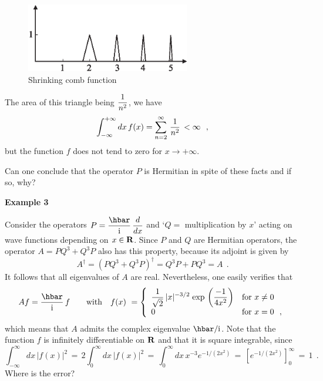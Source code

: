 \documentclass[12pt]{report}
\begin{document}
\bigskip 

\begin{figure}[h!]
\centerline{\includegraphics*[height=3cm,angle=0]{dessin2.eps}}
\caption{Shrinking comb function}
\end{figure}

\bigskip


\noindent 
The area
of this triangle being $\displaystyle{1 \over n^2}$,
we have
\[
\int_{-\infty}^{+\infty} dx \, f(x)  =
\sum_{n=2}^{\infty} \, \displaystyle{1 \over n^2} \, < \infty
\ \ ,
\]
but the function
$f$ does not tend to zero for $x \to +\infty$.


\noindent 
Can one conclude that the operator $P$ is Hermitian
in spite of these facts and if so, why?
 
\bigskip
 

\noindent 
{\bf Example 3}
 
\medskip

Consider the operators
$P= \ds{\hbar \over \ri} \, \ds{d \over dx}$ and `$Q=$ multiplication by
$x$' acting on wave functions depending on
$x \in {\bf R}$.
Since $P$ and $Q$ are Hermitian operators, the operator
$A =  PQ^3 +Q^3 P$
also has this property, because its adjoint is given by
\[
A^{\dag} = ( PQ^3 +Q^3 P )^{\dag} =
Q^3 P + PQ^3 = A
\ \ .
\]
It follows that all eigenvalues of $A$ are real.
Nevertheless, one easily verifies that
\begin{equation}
\label{fon}
Af = \ds{\hbar \over \ri} \, f
\qquad {\rm with} \quad
f(x) \ =
\left\{
\begin{array}{ll}
\ds{1\over \sqrt{2}} \, |x|^{-3/2} \; {\rm exp} \,
\left( {-1 \over 4x^2} \right)
& {\rm for} \ x \neq 0
\\
0
& {\rm for} \ x = 0 \ \ ,
\end{array}
\right.
\end{equation}
which means that $A$ admits the complex eigenvalue
$\hbar / \ri$.
Note that the function $f$ is infinitely differentiable on
${\bf R}$ and that it is square integrable, since
\[
\int_{-\infty}^{\infty} dx \, |f(x)|^2 \, = \, 2
\int_0^{\infty} dx \, |f(x)|^2 \, = \,
\int_0^{\infty} dx \, x^{-3} e^{-1/(2x^2)} \, = \,
\left[
e^{-1/(2x^2)} \right]_0^{\infty} \, = \, 1
\ \ .
\]
Where is the error?
 
\end{document}
